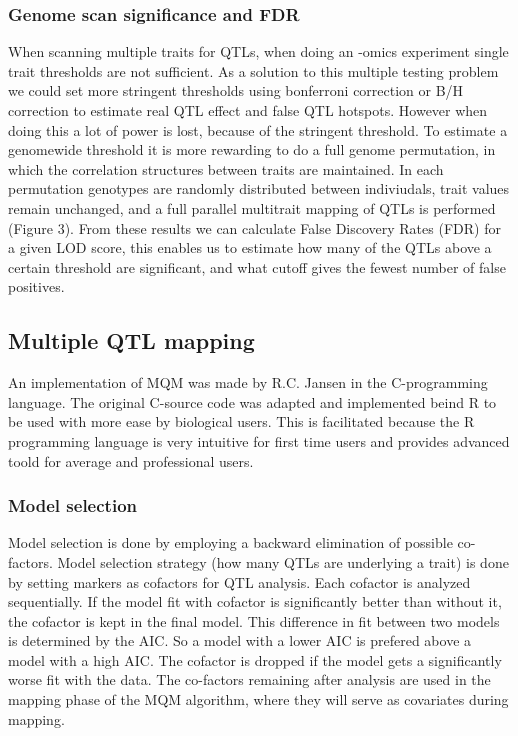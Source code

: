 \subsubsection*{Genome scan significance and FDR}
When scanning multiple traits for QTLs, when doing an -omics experiment single trait thresholds are not sufficient. As a solution to this multiple testing problem we could set more 
stringent thresholds using bonferroni correction or B/H correction to estimate real QTL effect and false QTL hotspots. However when doing this a lot of power is lost, 
because of the stringent threshold. To estimate a genomewide threshold it is more rewarding to do a full genome permutation, 
in which the correlation structures between traits are maintained.\cite{eQTL1} In each permutation genotypes are randomly distributed between indiviudals, 
trait values remain unchanged, and a full parallel multitrait mapping of QTLs is performed (Figure 3). From these results we can calculate False Discovery Rates (FDR) for a given LOD score, this enables us to estimate how many of the QTLs above a certain threshold 
are significant, and what cutoff gives the fewest number of false positives.
\subsection{Multiple QTL mapping}
An implementation of MQM was made by R.C. Jansen in the C-programming language. The original C-source code was adapted and implemented beind R to be used with more ease by biological users. This is facilitated because the R programming language is very intuitive for first time users and provides advanced toold for average and professional users.
\subsubsection*{Model selection}
Model selection is done by employing a backward elimination of possible co-factors. Model selection strategy (how many QTLs are underlying a trait) 
is done by setting markers as cofactors for QTL analysis. Each cofactor is analyzed sequentially. If the model fit with cofactor is significantly better than without it, the cofactor is kept in the final model. This difference in fit between two models is determined by the AIC. So a model with a lower AIC is prefered above a model with a high AIC. The cofactor is dropped if the model gets a significantly worse fit with the data. The co-factors remaining after analysis 
are used in the mapping phase of the MQM algorithm, where they will serve as covariates during mapping.
